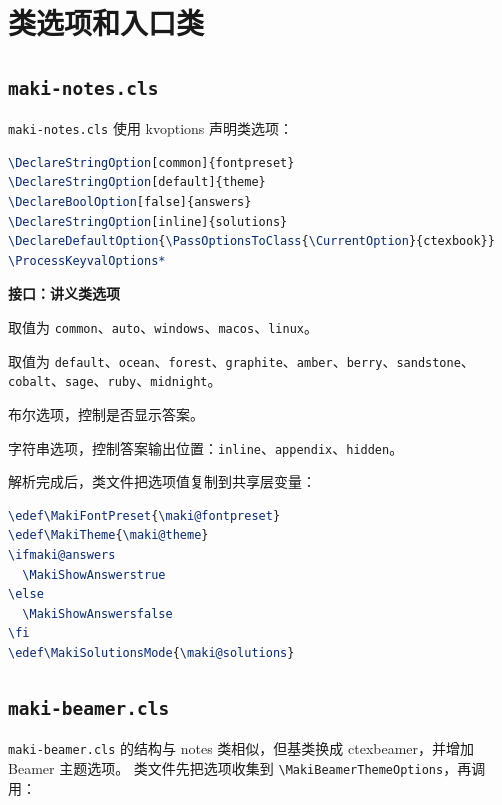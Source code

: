 \documentclass[a4paper,11pt]{ltxdoc}
\newcommand{\mfile}[1]{\texttt{#1}}
\newcommand{\mcls}[1]{\textsf{#1}}
\newcommand{\mpkg}[1]{\textsf{#1}}
\newcommand{\mopt}[1]{\texttt{#1}}
\newcommand{\mcmd}[1]{\texttt{\textbackslash#1}}
\newenvironment{interfaceblock}[1]
  {\par\medskip\noindent\textbf{\color{MakiBlue}接口：#1}\par\smallskip\begin{description}[leftmargin=3.2cm,style=nextline]}
  {\end{description}\par\medskip}
\begin{document}
\section{类选项和入口类}

\subsection{\mfile{maki-notes.cls}}

\mfile{maki-notes.cls} 使用 \mpkg{kvoptions} 声明类选项：

\begin{lstlisting}[language=TeX]
\DeclareStringOption[common]{fontpreset}
\DeclareStringOption[default]{theme}
\DeclareBoolOption[false]{answers}
\DeclareStringOption[inline]{solutions}
\DeclareDefaultOption{\PassOptionsToClass{\CurrentOption}{ctexbook}}
\ProcessKeyvalOptions*
\end{lstlisting}

\begin{interfaceblock}{讲义类选项}
\item[\mopt{fontpreset}] 取值为 \mopt{common}、\mopt{auto}、\mopt{windows}、\mopt{macos}、\mopt{linux}。
\item[\mopt{theme}] 取值为 \mopt{default}、\mopt{ocean}、\mopt{forest}、\mopt{graphite}、\mopt{amber}、\mopt{berry}、\mopt{sandstone}、\mopt{cobalt}、\mopt{sage}、\mopt{ruby}、\mopt{midnight}。
\item[\mopt{answers}] 布尔选项，控制是否显示答案。
\item[\mopt{solutions}] 字符串选项，控制答案输出位置：\mopt{inline}、\mopt{appendix}、\mopt{hidden}。
\end{interfaceblock}

解析完成后，类文件把选项值复制到共享层变量：

\begin{lstlisting}[language=TeX]
\edef\MakiFontPreset{\maki@fontpreset}
\edef\MakiTheme{\maki@theme}
\ifmaki@answers
  \MakiShowAnswerstrue
\else
  \MakiShowAnswersfalse
\fi
\edef\MakiSolutionsMode{\maki@solutions}
\end{lstlisting}

\subsection{\mfile{maki-beamer.cls}}

\mfile{maki-beamer.cls} 的结构与 notes 类相似，但基类换成 \mcls{ctexbeamer}，并增加 Beamer 主题选项。
类文件先把选项收集到 \mcmd{MakiBeamerThemeOptions}，再调用：
\end{document}
